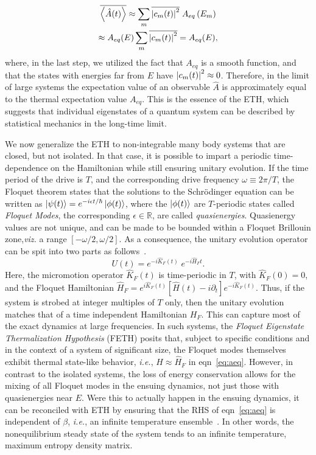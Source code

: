 \documentclass[%
reprint,
superscriptaddress,
amsmath,amssymb,
aps,
prb,
showkeys,
]{revtex4-2}
\begin{document}
\begin{multline*}
\overline{\expval{\hat{A}(t)}} \approx \sum_m \overline{\abs{c_m(t)}^2}\; {A}_{eq}\left(E_m\right)\\
\approx {A}_{eq}(E)\sum_m \overline{\abs{c_m(t)}^2} = A_{eq}(E),
\end{multline*}
where, in the last step, we utilized the fact that $A_{eq}$ is a smooth function, and that the states with energies far from $E$ have $\abs{c_m(t)}^2\approx 0$. Therefore, in the limit of large systems the expectation value of an observable $\hat{A}$ is approximately equal to the thermal expectation value $A_{eq}$. This is the essence of the ETH, which suggests that individual eigenstates of a quantum system can be described by statistical mechanics in the long-time limit.

We now generalize the ETH to non-integrable many body systems that are closed, but not isolated. In that case, it is possible to impart a periodic time-dependence on the Hamiltonian while still ensuring unitary evolution. If the time period of the drive is $T$, and the corresponding drive frequency $\omega\equiv 2\pi/T$, the Floquet theorem states that the solutions to the Schrödinger equation can be written as $\ket{\psi(t)} = e^{-i\epsilon t/\hbar} \ket{\phi(t)}$, where the $\ket{\phi(t)}$ are $T$-periodic states called \textit{Floquet Modes}, the corresponding $\epsilon\in \mathbb{R}$, are called \textit{quasienergies}. Quasienergy values are not unique, and can be made to be bounded within a Floquet {Brillouin zone},\textit{viz.} a range $[-\omega/2, \omega/2]$\cite{holthaus_floquet_2016,vogl_effective_2020}. As a consequence, the unitary evolution operator can be spit into two parts as follows~\cite{Bukov2014}.
\begin{equation}
\label{eq:propagator}
U(t) = e^{-i\hat{K}_F(t)}\;e^{-i\hat{H}_Ft}.
\end{equation}
Here, the micromotion operator $\hat{K}_F(t)$ is time-periodic in $T$, with $\hat{K}_F(0)=0$, and the Floquet Hamiltonian  {$\hat{H}_F = e^{i\hat{K}_F(t)} \left[\hat{H}(t)-i\partial_t\right] e^{-i \hat{K}_F(t)}$}. Thus, if the system is strobed at integer multiples of $T$ only, then the unitary evolution matches that of a time independent Hamiltonian $H_F$. This can capture most of the exact dynamics at large frequencies. In such systems, the \textit{Floquet Eigenstate Thermalization Hypothesis} (FETH)\cite{Mori_2018, Mori_2023_1} posits that, subject to specific conditions and in the context of a system of significant size, the Floquet modes themselves exhibit thermal state-like behavior, \textit{i.e.}, $\hat{H}\approx \hat{H}_F$ in eqn~\ref{eq:aeq}. However, in contrast to the isolated systems, the loss of energy conservation allows for the mixing of all Floquet modes in the ensuing dynamics, not just those with quasienergies near $E$. Were this to actually happen in the ensuing dynamics,  {it can be reconciled with ETH by ensuring that the RHS of eqn}~\ref{eq:aeq} {is independent of} $\beta$, \textit{i.e.}{, an infinite temperature ensemble}~\cite{alessio}. In other words, the nonequilibrium steady state of the system tends to an infinite temperature, maximum entropy density matrix.
\end{document}
